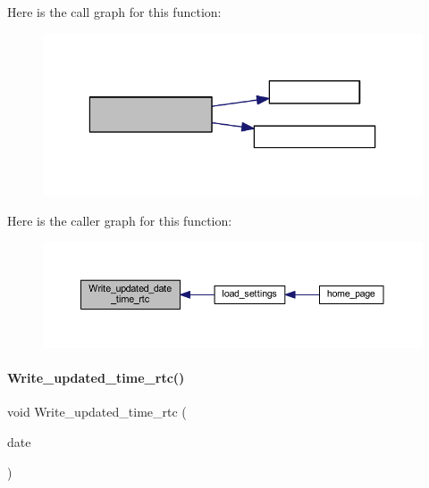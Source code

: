 Here is the call graph for this function\+:
\nopagebreak
\begin{figure}[H]
\begin{center}
\leavevmode
\includegraphics[width=323pt]{a00017_ad20fe32d70b509ba8f7f24a572e34f3f_cgraph}
\end{center}
\end{figure}
Here is the caller graph for this function\+:
\nopagebreak
\begin{figure}[H]
\begin{center}
\leavevmode
\includegraphics[width=350pt]{a00017_ad20fe32d70b509ba8f7f24a572e34f3f_icgraph}
\end{center}
\end{figure}
\mbox{\label{a00017_a2f6bf3793293cc3f2c09a91c3725a8af}} 
\paragraph{Write\+\_\+updated\+\_\+time\+\_\+rtc()}
{\footnotesize\ttfamily void Write\+\_\+updated\+\_\+time\+\_\+rtc (\begin{DoxyParamCaption}\item[{\textbf{ Date\+Time} $\ast$}]{date }\end{DoxyParamCaption})}

